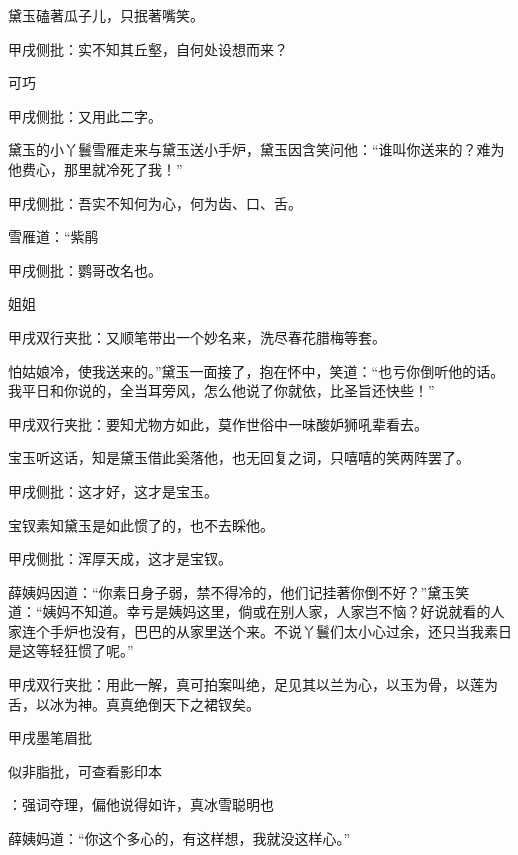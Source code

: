 \begin{parag}
    黛玉磕著瓜子儿，只抿著嘴笑。\begin{note}甲戌侧批：实不知其丘壑，自何处设想而来？\end{note}可巧\begin{note}甲戌侧批：又用此二字。\end{note}黛玉的小丫鬟雪雁走来与黛玉送小手炉，黛玉因含笑问他：“谁叫你送来的？难为他费心，那里就冷死了我！”\begin{note}甲戌侧批：吾实不知何为心，何为齿、口、舌。\end{note}雪雁道：“紫鹃\begin{note}甲戌侧批：鹦哥改名也。\end{note}姐姐\begin{note}甲戌双行夹批：又顺笔带出一个妙名来，洗尽春花腊梅等套。\end{note}怕姑娘冷，使我送来的。”黛玉一面接了，抱在怀中，笑道：“也亏你倒听他的话。我平日和你说的，全当耳旁风，怎么他说了你就依，比圣旨还快些！”\begin{note}甲戌双行夹批：要知尤物方如此，莫作世俗中一味酸妒狮吼辈看去。\end{note}宝玉听这话，知是黛玉借此奚落他，也无回复之词，只嘻嘻的笑两阵罢了。\begin{note}甲戌侧批：这才好，这才是宝玉。\end{note}宝钗素知黛玉是如此惯了的，也不去睬他。\begin{note}甲戌侧批：浑厚天成，这才是宝钗。\end{note}薛姨妈因道：“你素日身子弱，禁不得冷的，他们记挂著你倒不好？”黛玉笑道：“姨妈不知道。幸亏是姨妈这里，倘或在别人家，人家岂不恼？好说就看的人家连个手炉也没有，巴巴的从家里送个来。不说丫鬟们太小心过余，还只当我素日是这等轻狂惯了呢。”\begin{note}甲戌双行夹批：用此一解，真可拍案叫绝，足见其以兰为心，以玉为骨，以莲为舌，以冰为神。真真绝倒天下之裙钗矣。\end{note}\begin{note}甲戌墨笔眉批\begin{subnote}似非脂批，可查看影印本\end{subnote}：强词夺理，偏他说得如许，真冰雪聪明也\end{note}薛姨妈道：“你这个多心的，有这样想，我就没这样心。”
\end{parag}


